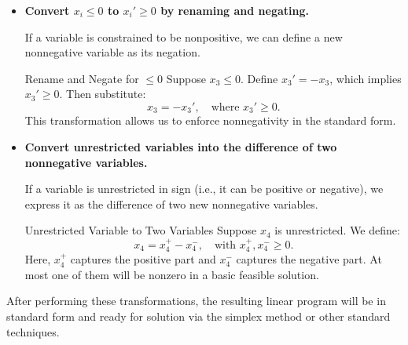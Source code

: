 \begin{itemize}
    \item[(a)] \textbf{Convert \( x_i \leq 0 \) to \( x_i' \geq 0 \) by renaming and negating.}

    If a variable is constrained to be nonpositive, we can define a new nonnegative variable as its negation.

    \begin{example}{Rename and Negate for \(\leq 0\)}{}
    Suppose \( x_3 \leq 0 \). Define \( x_3' = -x_3 \), which implies \( x_3' \geq 0 \). Then substitute:
    \[
    x_3 = -x_3', \quad \text{where } x_3' \geq 0.
    \]
    This transformation allows us to enforce nonnegativity in the standard form.
    \end{example}

    \item[(b)] \textbf{Convert unrestricted variables into the difference of two nonnegative variables.}

    If a variable is unrestricted in sign (i.e., it can be positive or negative), we express it as the difference of two new nonnegative variables.

    \begin{example}{Unrestricted Variable to Two Variables}{}
    Suppose \( x_4 \) is unrestricted. We define:
    \[
    x_4 = x_4^+ - x_4^-, \quad \text{with } x_4^+, x_4^- \geq 0.
    \]
    Here, \( x_4^+ \) captures the positive part and \( x_4^- \) captures the negative part. At most one of them will be nonzero in a basic feasible solution.
    \end{example}
\end{itemize}

\medskip

After performing these transformations, the resulting linear program will be in standard form and ready for solution via the simplex method or other standard techniques.

